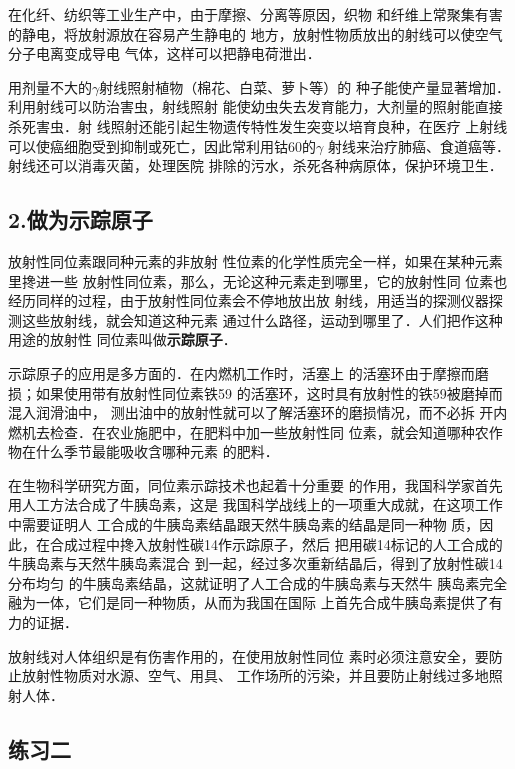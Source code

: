 在化纤、纺织等工业生产中，由于摩擦、分离等原因，织物
和纤维上常聚集有害的静电，将放射源放在容易产生静电的
地方，放射性物质放出的射线可以使空气分子电离变成导电
气体，这样可以把静电荷泄出．

用剂量不大的$\gamma$射线照射植物（棉花、白菜、萝卜等）的
种子能使产量显著增加．利用射线可以防治害虫，射线照射
能使幼虫失去发育能力，大剂量的照射能直接杀死害虫．射
线照射还能引起生物遗传特性发生突变以培育良种，在医疗
上射线可以使癌细胞受到抑制或死亡，因此常利用钴60的$\gamma$
射线来治疗肺癌、食道癌等．射线还可以消毒灭菌，处理医院
排除的污水，杀死各种病原体，保护环境卫生．

\subsection*{2.做为示踪原子}

放射性同位素跟同种元素的非放射
性位素的化学性质完全一样，如果在某种元素里搀进一些
放射性同位素，那么，无论这种元素走到哪里，它的放射性同
位素也经历同样的过程，由于放射性同位素会不停地放出放
射线，用适当的探测仪器探测这些放射线，就会知道这种元素
通过什么路径，运动到哪里了．人们把作这种用途的放射性
同位素叫做\textbf{示踪原子}．

示踪原子的应用是多方面的．在内燃机工作时，活塞上
的活塞环由于摩擦而磨损；如果使用带有放射性同位素铁59
的活塞环，这时具有放射性的铁59被磨掉而混入润滑油中，
测出油中的放射性就可以了解活塞环的磨损情况，而不必拆
开内燃机去检查．在农业施肥中，在肥料中加一些放射性同
位素，就会知道哪种农作物在什么季节最能吸收含哪种元素
的肥料．

在生物科学研究方面，同位素示踪技术也起着十分重要
的作用，我国科学家首先用人工方法合成了牛胰岛素，这是
我国科学战线上的一项重大成就，在这项工作中需要证明人
工合成的牛胰岛素结晶跟天然牛胰岛素的结晶是同一种物
质，因此，在合成过程中搀入放射性碳14作示踪原子，然后
把用碳14标记的人工合成的牛胰岛素与天然牛胰岛素混合
到一起，经过多次重新结晶后，得到了放射性碳14分布均匀
的牛胰岛素结晶，这就证明了人工合成的牛胰岛素与天然牛
胰岛素完全融为一体，它们是同一种物质，从而为我国在国际
上首先合成牛胰岛素提供了有力的证据．

放射线对人体组织是有伤害作用的，在使用放射性同位
素时必须注意安全，要防止放射性物质对水源、空气、用具、
工作场所的污染，并且要防止射线过多地照射人体．


\subsection*{练习二}

